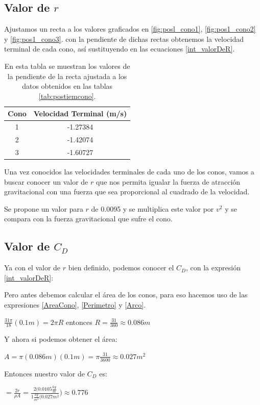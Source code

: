 \subsection{Valor de $r$}

Ajustamos un recta a los valores graficados en
\ref{fig:posl_cono1}, \ref{fig:pos1_cono2} y \ref{fig:pos1_cono3}.
con la pendiente de dichas rectas obtenemos la velocidad
terminal de cada cono, así sustituyendo en las ecuaciones
\ref{int_valorDeR}.

\begin{table}
    \centering
    \begin{tabular}{|c|c|}
        \hline
        \rowcolor{azulito} Cono & Velocidad Terminal (m/s) \\
        \hline 1 & -1.27384 \\
        \hline 2 & -1.42074 \\
        \hline 3 & -1.60727 \\
        \hline
    \end{tabular}
    \caption{En esta tabla se muestran los valores
    de la pendiente de la recta ajustada a los datos
    obtenidos en las tablas \ref{tab:postiemcono}.}
    \label{tab:VelTerminal}
\end{table}

Una vez conocidos las velocidades terminales de cada uno de los
conos, vamos a buscar conocer un valor de $r$ que nos permita
igualar la fuerza de atracción gravitacional con una fuerza que 
sea proporcional al cuadrado de la velocidad.

Se propone un valor para $r$ de 0.0095 y se multiplica este
valor por $v^2$ y se compara con la fuerza gravitacional que
sufre el cono.
\subsection{Valor de $C_D$}

Ya con el valor de $r$ bien definido, podemos conocer el
$C_D$, con la expresión \ref{int_valorDeR}:

Pero antes debemos calcular el área de los conos, para eso
hacemos uso de las expresiones \ref{AreaCono}, \ref{Perimetro}
y \ref{Arco}.

$\frac{31 \pi}{18}(0.1 m) = 2\pi R$
entonces $R = \frac{31}{360} \approx 0.086 m$

Y ahora si podemos obtener el área:

$A = \pi (0.086 m) (0.1 m) = \pi \frac{31}{3600} \approx 0.027m^2$

Entonces nuestro valor de $C_D$ es:

$ = \frac{2r}{\rho A} = \frac{2(0.0105\frac{kg}{m}}{1\frac{kg}{m^3}(0.027 m^2}) \approx 0.776$
